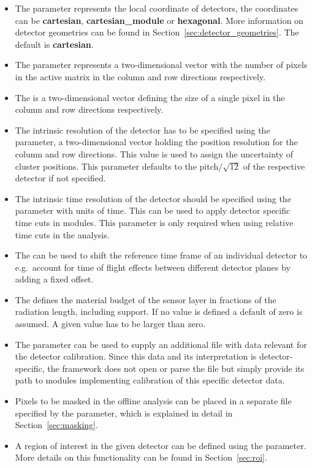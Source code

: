 \begin{itemize}
\item The  parameter represents the local coordinate of detectors, the coordinates can be \textbf{cartesian}, \textbf{cartesian\_module} or \textbf{hexagonal}. More information on detector geometries can be found in Section~\ref{sec:detector_geometries}. The default  is \textbf{cartesian}.

\item The  parameter represents a two-dimensional vector with the number of pixels in the active matrix in the column and row directions respectively.
\item The  is a two-dimensional vector defining the size of a single pixel in the column and row directions respectively.
\item The intrinsic resolution of the detector has to be specified using the  parameter, a two-dimensional vector holding the position resolution for the column and row directions. This value is used to assign the uncertainty of cluster positions. This parameter defaults to the pitch$/\sqrt{12}$ of the respective detector if not specified.
\item The intrinsic time resolution of the detector should be specified using the  parameter with units of time. This can be used to apply detector specific time cuts in modules. This parameter is only required when using relative time cuts in the analysis.
\item The  can be used to shift the reference time frame of an individual detector to e.g.\ account for time of flight effects between different detector planes by adding a fixed offset.
\item The  defines the material budget of the sensor layer in fractions of the radiation length, including support. If no value is defined a default of zero is assumed. A given value has to be larger than zero.
\item The  parameter can be used to supply an additional file with data relevant for the detector calibration. Since this data and its interpretation is detector-specific, the framework does not open or parse the file but simply provide its path to modules implementing calibration of this specific detector data.
\item Pixels to be masked in the offline analysis can be placed in a separate file specified by the  parameter, which is explained in detail in Section~\ref{sec:masking}.
\item A region of interest in the given detector can be defined using the  parameter. More details on this functionality can be found in Section~\ref{sec:roi}.
\end{itemize}

